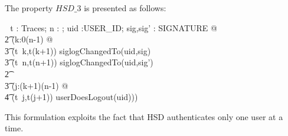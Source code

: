 \documentclass[a4paper,pdftex]{article}
\newcommand{\turnstile}{\vdash \, \,}
\newcommand{\zcomment}[1]{#1}
\begin{document}
The property $HSD\_3$ is presented as follows:
\zcomment{
\begin{zed}
\turnstile \forall t : Traces; n : \nat; uid :USER\_ID; sig,sig' : SIGNATURE @            \\
\t2           (\forall k:0\upto(n-1) @                                         \\
\t3                           (t~k,t(k+1)) \in siglogChangedTo(uid,sig)\land   \\
\t3                           (t~n,t(n+1)) \in siglogChangedTo(uid,sig')       \\
\t2                        \implies                                            \\
\t3                           (\exists j:(k+1)\upto(n-1) @                     \\
\t4                               (t~j,t(j+1)) \in userDoesLogout(uid)))
\end{zed}
}

This formulation exploits the fact that
HSD authenticates only one user at a time.
\end{document}

